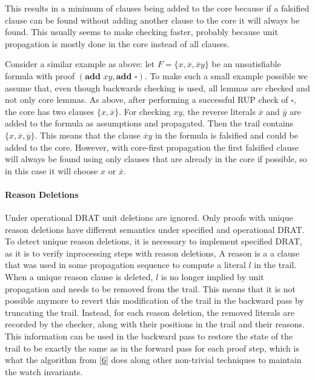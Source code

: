 \documentclass[
]{report}
\begin{document}
This results in a minimum of clauses being added to the core because if
a falsified clause can be found without adding another clause to the
core it will always be found. This usually seems to make checking
faster, probably because unit propagation is mostly done in the core
instead of all clauses.

Consider a similar example as above: let
\(F = \{x, \overline{x}, \overline{x}y\}\) be an unsatisfiable formula
with proof \((\textbf{add }xy, \textbf{add }\square)\). To make such a
small example possible we assume that, even though backwards checking is
used, all lemmas are checked and not only core lemmas. As above, after
performing a successful RUP check of \(\square\), the core has two
clauses \(\{x, \overline{x}\}\). For checking \(xy\), the reverse
literals \(\overline{x}\) and \(\overline{y}\) are added to the formula
as assumptions and propagated. Then the trail contains
\(\{x, \overline{x}, \overline{y}\}\). This means that the clause
\(\overline{x}y\) in the formula is falsified and could be added to the
core. However, with core-first propagation the first falsified clause
will always be found using only clauses that are already in the core if
possible, so in this case it will choose \(x\) or \(\overline{x}\).

\paragraph{Reason Deletions}

Under operational DRAT unit deletions are ignored. Only proofs with
unique reason deletions have different semantics under specified and
operational DRAT. To detect unique reason deletions, it is necessary to
implement specified DRAT, as it is to verify inprocessing steps with
reason deletions, A reason is a a clause that was used in some
propagation sequence to compute a literal \(l\) in the trail. When a
unique reason clause is deleted, \(l\) is no longer implied by unit
propagation and needs to be removed from the trail. This means that it
is not possible anymore to revert this modification of the trail in the
backward pass by truncating the trail. Instead, for each reason
deletion, the removed literals are recorded by the checker, along with
their positions in the trail and their reasons. This information can be
used in the backward pass to restore the state of the trail to be
exactly the same as in the forward pass for each proof step, which is
what the algorithm from {[}\protect\hyperlink{ref-RebolaCruz2018}{6}{]}
does along other non-trivial techniques to maintain the watch
invariants.
\end{document}
